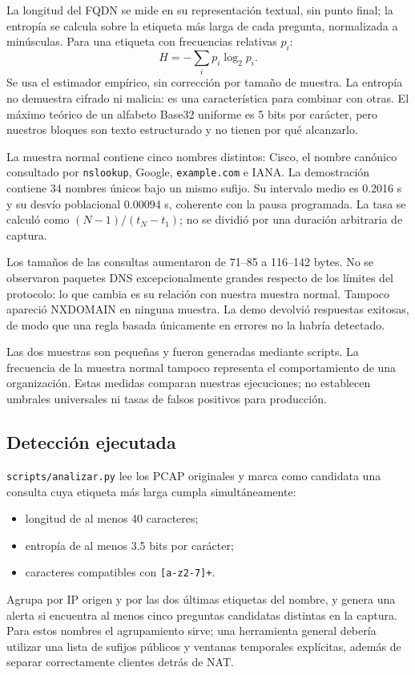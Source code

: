 \documentclass[11pt,a4paper]{article}
\begin{document}
La longitud del FQDN se mide en su representación textual, sin punto final;
la entropía se calcula sobre la etiqueta más larga de cada pregunta,
normalizada a minúsculas. Para una etiqueta con frecuencias relativas $p_i$:
\[
H=-\sum_i p_i\log_2 p_i.
\]
Se usa el estimador empírico, sin corrección por tamaño de muestra. La
entropía no demuestra cifrado ni malicia: es una característica para combinar
con otras. El máximo teórico de un alfabeto Base32 uniforme es 5 bits por
carácter, pero nuestros bloques son texto estructurado y no tienen por qué
alcanzarlo.

La muestra normal contiene cinco nombres distintos: Cisco, el nombre canónico
consultado por \texttt{nslookup}, Google, \nolinkurl{example.com} e IANA. La
demostración contiene 34 nombres únicos bajo un mismo sufijo. Su intervalo
medio es 0.2016 s y su desvío poblacional 0.00094 s, coherente con la pausa
programada. La tasa se calculó como $(N-1)/(t_N-t_1)$; no se dividió por
una duración arbitraria de captura.

Los tamaños de las consultas aumentaron de 71--85 a 116--142 bytes.
No se observaron paquetes DNS excepcionalmente grandes respecto de los
límites del protocolo: lo que cambia es su relación con nuestra muestra
normal. Tampoco apareció NXDOMAIN en ninguna muestra. La demo devolvió
respuestas exitosas, de modo que una regla basada únicamente en errores no
la habría detectado.

Las dos muestras son pequeñas y fueron generadas mediante scripts. La
frecuencia de la muestra normal tampoco representa el comportamiento de
una organización. Estas medidas comparan nuestras ejecuciones; no establecen
umbrales universales ni tasas de falsos positivos para producción.

\begin{samepage}
\subsection{Detección ejecutada}

\nolinkurl{scripts/analizar.py} lee los PCAP originales y marca como candidata
una consulta cuya etiqueta más larga cumpla simultáneamente:
\begin{itemize}[noitemsep]
\item longitud de al menos 40 caracteres;
\item entropía de al menos 3.5 bits por carácter;
\item caracteres compatibles con \texttt{[a-z2-7]+}.
\end{itemize}
\end{samepage}
Agrupa por IP origen y por las dos últimas etiquetas del nombre, y genera
una alerta si encuentra al menos cinco preguntas candidatas distintas en
la captura. Para estos nombres el agrupamiento sirve; una herramienta
general debería utilizar una lista de sufijos públicos y ventanas temporales
explícitas, además de separar correctamente clientes detrás de NAT.
\end{document}
